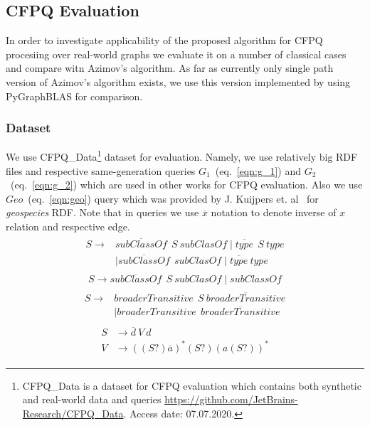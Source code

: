 \subsection{CFPQ Evaluation}

In order to investigate applicability of the proposed algorithm for CFPQ procesiing over real-world graphs we evaluate it on a number of classical cases and compare witn Azimov's algorithm.
As far as currently only single path version of Azimov's algorithm exists, we use this version implemented by using PyGraphBLAS for comparison.

\subsubsection{Dataset}

We use CFPQ\_Data\footnote{CFPQ\_Data is a dataset for CFPQ evaluation which contains both synthetic and real-world data and queries \url{https://github.com/JetBrains-Research/CFPQ\_Data}. Access date: 07.07.2020.} dataset for evaluation.
Namely, we use relatively big RDF files and respective same-generation queries $G_1$~(eq.~\ref{eqn:g_1}) and $G_2$~(eq.~\ref{eqn:g_2}) which are used in other works for CFPQ evaluation. 
Also we use $Geo$~(eq.~\ref{eqn:geo}) query which was provided by J. Kuijpers et. al~\cite{Kuijpers:2019:ESC:3335783.3335791} for \textit{geospecies} RDF.
Note that in queries we use $\overline{x}$ notation to denote inverse of $x$ relation and respective edge.
\begin{align}
\begin{split}
\label{eqn:g_1}
S \to & \overline{\textit{subClassOf}} \ \ S \ \textit{subClasOf} \mid \overline{\textit{type}} \ \ S \ \textit{type}\\   & \mid \overline{\textit{subClassOf}} \ \ \textit{subClasOf} \mid \overline{\textit{type}} \ \textit{type}
\end{split}
\end{align}
\begin{align}
\label{eqn:g_2}
S \to \overline{\textit{subClassOf}} \ \ S \ \textit{subClasOf} \mid \textit{subClassOf}
\end{align}
\begin{align}
\begin{split}
\label{eqn:geo}
S \to & \textit{broaderTransitive} \ \  S \ \overline{\textit{broaderTransitive}} \\
      & \mid \textit{broaderTransitive} \ \  \overline{\textit{broaderTransitive}}
\end{split}
\end{align}
\begin{align}
\begin{split}
\label{eqn:ma}
S & \to \overline{d} \ V \ d \\
V & \to ((S?) \overline{a})^* (S?) (a (S?))^*
\end{split}
\end{align}

